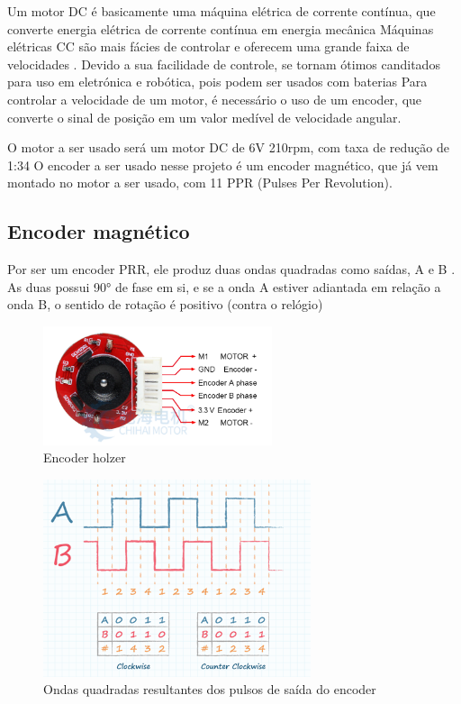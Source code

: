 
Um motor DC é basicamente uma máquina elétrica de corrente contínua, que converte energia elétrica de corrente contínua em energia mecânica
Máquinas elétricas CC são mais fácies de controlar e oferecem uma grande faixa de velocidades \cite{Maquinas_eletricas}.
Devido a sua facilidade de controle, se tornam ótimos canditados para uso em eletrónica e robótica, pois podem ser usados com baterias
Para controlar a velocidade de um motor, é necessário o uso de um encoder, que converte o sinal de posição em um valor medível de velocidade angular.


O motor a ser usado será um motor DC de 6V 210rpm, com taxa de redução de 1:34
O encoder a ser usado nesse projeto é um encoder magnético, que já vem montado no motor a ser usado, com 11 PPR (Pulses Per Revolution).

\subsection{Encoder magnético}

Por ser um encoder PRR, ele produz duas ondas quadradas como saídas, A e B \cite{encoder_ppr}.
As duas possui 90° de fase em si, e se a onda A estiver adiantada em relação a onda B, o sentido de rotação é positivo (contra o relógio)

\begin{figure}[h]
	\centering
	\includegraphics[width=0.6\textwidth]{figures/encoder_holzer}
	\caption{Encoder holzer \cite{encoder_holzer}}
\end{figure}

\begin{figure}[h]
	\centering
	\includegraphics[width=0.7\textwidth]{figures/encoder_pulso_ab}
	\caption{Ondas quadradas resultantes dos pulsos de saída do encoder \cite{encoder_ppr}}
\end{figure}


